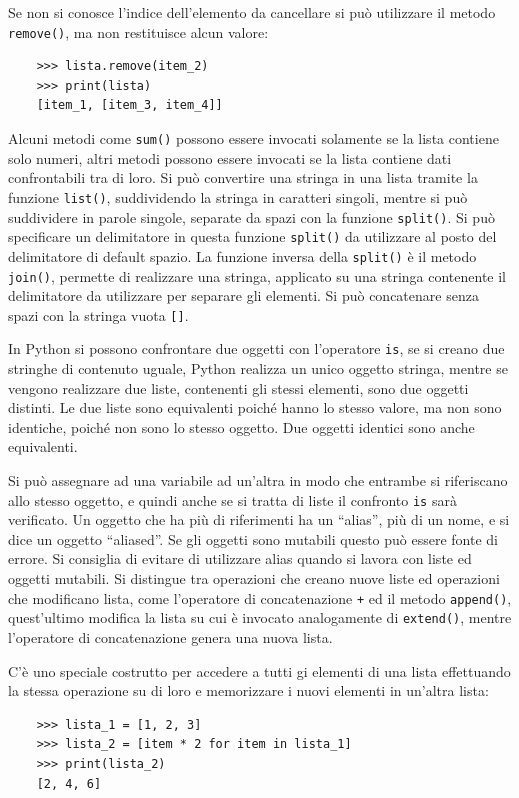 \documentclass{article}
\numberwithin{equation}{subsection}
\begin{document}
Se non si conosce l'indice dell'elemento da cancellare si può utilizzare il metodo \verb|remove()|, ma non restituisce alcun valore:
\begin{verbatim}
    >>> lista.remove(item_2)
    >>> print(lista)
    [item_1, [item_3, item_4]]
\end{verbatim}

Alcuni metodi come \verb|sum()| possono essere invocati solamente se la lista contiene solo numeri, altri metodi possono essere invocati se la lista contiene dati 
confrontabili tra di loro. 
Si può convertire una stringa in una lista tramite la funzione \verb|list()|, suddividendo la stringa in caratteri singoli, mentre si può suddividere in parole singole, 
separate da spazi con la funzione \verb|split()|. Si può specificare un delimitatore in questa funzione \verb|split()| da utilizzare al posto del delimitatore di default 
spazio. La funzione inversa della \verb|split()| è il metodo \verb|join()|, permette di realizzare una stringa, applicato su una stringa contenente il delimitatore 
da utilizzare per separare gli elementi. Si può concatenare senza spazi con la stringa vuota \verb|[]|. 

In Python si possono confrontare due oggetti con l'operatore \verb|is|, se si creano due stringhe di contenuto uguale, Python realizza un unico oggetto stringa, 
mentre se vengono realizzare due liste, contenenti gli stessi elementi, sono due oggetti distinti.  
Le due liste sono equivalenti poiché hanno lo stesso valore, ma non sono identiche, poiché non sono lo stesso oggetto. Due oggetti identici sono anche equivalenti. 

Si può assegnare ad una variabile ad un'altra in modo che entrambe si riferiscano allo stesso oggetto, e quindi anche se si tratta di liste il confronto \verb|is| sarà 
verificato. Un oggetto che ha più di riferimenti ha un ``alias'', più di un nome, e si dice un oggetto ``aliased''. Se gli oggetti sono mutabili questo può essere 
fonte di errore. 
Si consiglia di evitare di utilizzare alias quando si lavora con liste ed oggetti mutabili. Si distingue tra operazioni che creano nuove liste ed operazioni che modificano 
lista, come l'operatore di concatenazione \verb|+| ed il metodo \verb|append()|, quest'ultimo modifica la lista su cui è invocato analogamente di \verb|extend()|, mentre l'operatore di 
concatenazione genera una nuova lista. 


C'è uno speciale costrutto per accedere a tutti gi elementi di una lista effettuando la stessa operazione su di loro e memorizzare i nuovi elementi in un'altra 
lista:
\begin{verbatim}
    >>> lista_1 = [1, 2, 3]
    >>> lista_2 = [item * 2 for item in lista_1]
    >>> print(lista_2)
    [2, 4, 6]
\end{verbatim}
\end{document}
